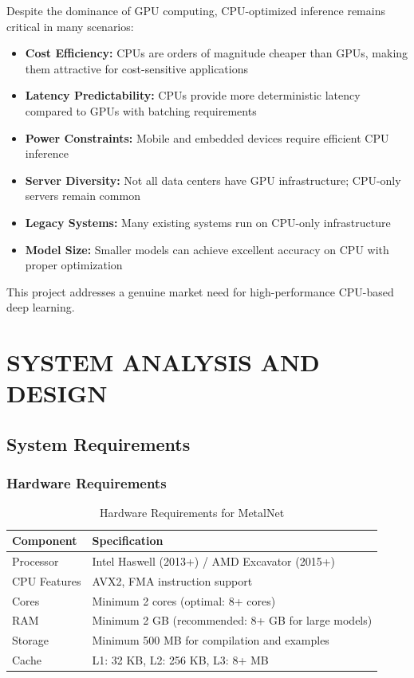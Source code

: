 \documentclass[12pt,oneside,a4paper]{report}
\begin{document}
Despite the dominance of GPU computing, CPU-optimized inference remains critical in many scenarios:

\begin{itemize}
    \item \textbf{Cost Efficiency:} CPUs are orders of magnitude cheaper than GPUs, making them attractive for cost-sensitive applications
    \item \textbf{Latency Predictability:} CPUs provide more deterministic latency compared to GPUs with batching requirements
    \item \textbf{Power Constraints:} Mobile and embedded devices require efficient CPU inference
    \item \textbf{Server Diversity:} Not all data centers have GPU infrastructure; CPU-only servers remain common
    \item \textbf{Legacy Systems:} Many existing systems run on CPU-only infrastructure
    \item \textbf{Model Size:} Smaller models can achieve excellent accuracy on CPU with proper optimization
\end{itemize}

This project addresses a genuine market need for high-performance CPU-based deep learning.

\newpage

\chapter{SYSTEM ANALYSIS AND DESIGN}

\section{System Requirements}

\subsection{Hardware Requirements}

\begin{table}[H]
\centering
\caption{Hardware Requirements for MetalNet}
\begin{tabular}{|l|l|}
\hline
\textbf{Component} & \textbf{Specification} \\
\hline
Processor & Intel Haswell (2013+) / AMD Excavator (2015+) \\
CPU Features & AVX2, FMA instruction support \\
Cores & Minimum 2 cores (optimal: 8+ cores) \\
RAM & Minimum 2 GB (recommended: 8+ GB for large models) \\
Storage & Minimum 500 MB for compilation and examples \\
Cache & L1: 32 KB, L2: 256 KB, L3: 8+ MB \\
\hline
\end{tabular}
\end{table}
\end{document}
